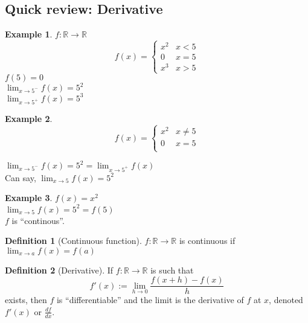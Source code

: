 \documentclass[twocolumn,20pt,fleqn]{extarticle}
\theoremstyle{plain}
\theoremstyle{definition}
\newtheorem*{definition}{Definition}
\newtheorem*{example}{Example}
\theoremstyle{remark}
\begin{document}
\subsection{Quick review: Derivative}
\begin{example}
  $f : \mathbb{R}\to \mathbb{R}$
  \[f(x) =
      \begin{cases}
        x^2 & x < 5\\
        0 & x = 5\\
        x^3 & x > 5
      \end{cases}
      \]
      $f(5)=0$\\
$\displaystyle\lim_{x \to 5^-} f(x)  = 5^2$\\
$\displaystyle\lim_{x \to 5^+} f(x)  = 5^3$
\end{example}


\begin{example}
  \[f(x) =
      \begin{cases}
        x^2 & x  \neq  5\\
        0 & x = 5\\
        
      \end{cases}
      \]
      
      


$\displaystyle\lim_{x \to 5^-} f(x) = 5^2  = \displaystyle\lim_{x \to 5^+} f(x)$\\
Can say, $\displaystyle\lim_{x \to 5} f(x) = 5^2$
\end{example}

\newpage
\begin{example}
$f(x) = x^2$\\
$\displaystyle\lim_{x \to 5} f(x) = 5^2 = f(5)$\\
$f$ is ``continous''.
\end{example}

\begin{definition}[Continuous function]
$f : \mathbb{R} \to \mathbb{R}$ is continuous if $\displaystyle\lim_{x \to a} f(x) = f(a)$
\end{definition}

\begin{definition}[Derivative]
  If $f : \mathbb{R}\to \mathbb{R}$ is such that
  \[ f'(x) := \displaystyle\lim_{h\to 0}\frac{f(x+h) - f(x)}{h}\] exists, then $f$ is ``differentiable'' and the limit is the derivative of $f$ at $x$, denoted $f'(x)$ or $\frac{df}{dx}$.  
\end{definition}
\end{document}
